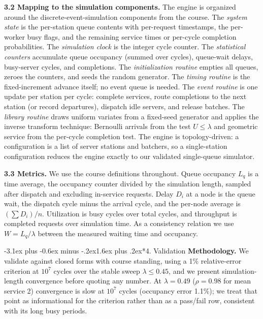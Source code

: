 \documentclass[11pt,a4paper]{article}
\makeatletter
\renewcommand\section{\@startsection{section}{1}{\z@}%
  {-3.1ex plus -0.6ex minus -.2ex}{1.6ex plus .2ex}{\normalfont\Large\bfseries}}
\makeatother
\begin{document}
\textbf{3.2 Mapping to the simulation components.} The engine is organized
around the discrete-event-simulation components from the course. The
\emph{system state} is the per-station queue contents with per-request
timestamps, the per-worker busy flags, and the remaining service times or
per-cycle completion probabilities. The \emph{simulation clock} is the integer
cycle counter. The \emph{statistical counters} accumulate queue occupancy
(summed over cycles), queue-wait delays, busy-server cycles, and completions.
The \emph{initialization routine} empties all queues, zeroes the counters, and
seeds the random generator. The \emph{timing routine} is the fixed-increment
advance itself; no event queue is needed. The \emph{event routine} is one
update per station per cycle: complete services, route completions to the next
station (or record departures), dispatch idle servers, and release batches.
The \emph{library routine} draws uniform variates from a fixed-seed generator
and applies the inverse transform technique: Bernoulli arrivals from the test
$U \le \lambda$ and geometric service from the per-cycle completion test. The
engine is topology-driven: a configuration is a list of server stations and
batchers, so a single-station configuration reduces the engine exactly to our
validated single-queue simulator.

\textbf{3.3 Metrics.} We use the course definitions throughout. Queue
occupancy $L_q$ is a time average, the occupancy counter divided by the
simulation length, sampled after dispatch and excluding in-service requests.
Delay $D_i$ at a node is the queue wait, the dispatch cycle minus the arrival
cycle, and the per-node average is $(\sum D_i)/n$. Utilization is busy cycles
over total cycles, and throughput is completed requests over simulation time.
As a consistency relation we use $W = L_q/\lambda$ between the measured
waiting time and occupancy.

\section*{4. Validation}
\textbf{Methodology.} We validate against closed forms with course standing,
using a 1\% relative-error criterion at $10^7$ cycles over the stable sweep
$\lambda \le 0.45$, and we present simulation-length convergence before quoting
any number. At $\lambda = 0.49$ ($\rho = 0.98$ for mean service 2) convergence
is slow at $10^7$ cycles (occupancy error 1.1\%); we treat that point as
informational for the criterion rather than as a pass/fail row, consistent
with its long busy periods.
\end{document}
